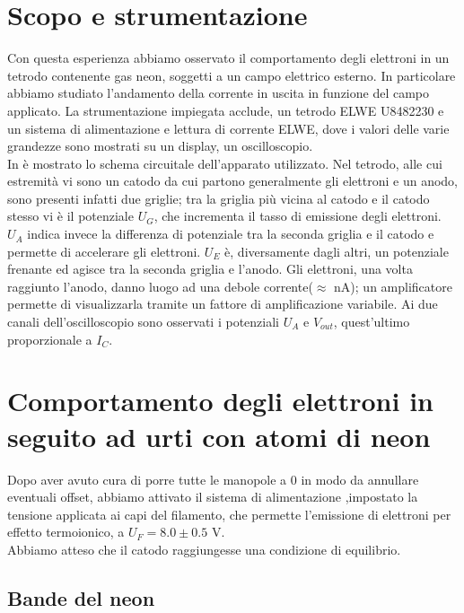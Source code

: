 \section{Scopo e strumentazione}

Con questa esperienza abbiamo osservato il comportamento degli elettroni in un tetrodo contenente gas neon, soggetti a un campo elettrico esterno. In particolare abbiamo studiato l'andamento della corrente in uscita in funzione del campo applicato. La strumentazione impiegata acclude, un tetrodo ELWE U8482230 e un sistema di alimentazione e lettura di corrente ELWE, dove i valori delle varie grandezze sono mostrati su un display, un oscilloscopio.\\
In  è mostrato lo schema circuitale dell'apparato utilizzato. Nel tetrodo, alle cui estremità vi sono un catodo da cui partono generalmente gli elettroni e un anodo, sono presenti infatti due griglie; tra la griglia più vicina al catodo e il catodo stesso vi è il potenziale 
$U_G$, che incrementa il tasso di emissione degli elettroni. $U_A$ indica invece la differenza di potenziale tra la seconda griglia e il catodo e permette di accelerare gli elettroni. $U_E$ è, diversamente dagli altri, un potenziale frenante ed agisce tra la seconda griglia e l'anodo. Gli elettroni, una volta raggiunto l'anodo, danno luogo ad una debole corrente($\approx$ nA); un amplificatore permette di visualizzarla tramite un fattore di amplificazione variabile. Ai due canali dell'oscilloscopio sono osservati i potenziali $U_A$ e $V_{out}$, quest'ultimo proporzionale a $I_C$.

\section{Comportamento degli elettroni in seguito ad urti con atomi di neon}

Dopo aver avuto cura di porre tutte le manopole a 0 in modo da annullare eventuali offset, abbiamo attivato il sistema di alimentazione ,impostato la tensione applicata ai capi del filamento, che permette l'emissione di elettroni per effetto termoionico, a $U_F = 8.0 \pm 0.5$ V.\\  Abbiamo atteso che il catodo raggiungesse una condizione di equilibrio.

\subsection{Bande del neon}

